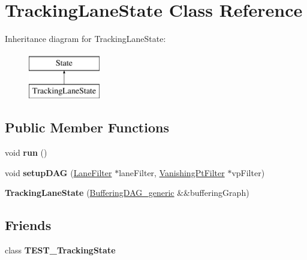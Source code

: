 \hypertarget{classTrackingLaneState}{\section{Tracking\-Lane\-State Class Reference}
\label{classTrackingLaneState}
}
Inheritance diagram for Tracking\-Lane\-State\-:\begin{figure}[H]
\begin{center}
\leavevmode
\includegraphics[height=2.000000cm]{classTrackingLaneState}
\end{center}
\end{figure}
\subsection*{Public Member Functions}
\begin{DoxyCompactItemize}
\item 
\hypertarget{classTrackingLaneState_ac57803df98ba03024c29ad864fddea11}{void {\bfseries run} ()}\label{classTrackingLaneState_ac57803df98ba03024c29ad864fddea11}

\item 
\hypertarget{classTrackingLaneState_a5f769fb1982e95791b5735844e5c0aa2}{void {\bfseries setup\-D\-A\-G} (\hyperlink{classLaneFilter}{Lane\-Filter} $\ast$lane\-Filter, \hyperlink{classVanishingPtFilter}{Vanishing\-Pt\-Filter} $\ast$vp\-Filter)}\label{classTrackingLaneState_a5f769fb1982e95791b5735844e5c0aa2}

\item 
\hypertarget{classTrackingLaneState_a77d46118062db8bdc0b114baaaece36e}{{\bfseries Tracking\-Lane\-State} (\hyperlink{classBufferingDAG__generic}{Buffering\-D\-A\-G\-\_\-generic} \&\&buffering\-Graph)}\label{classTrackingLaneState_a77d46118062db8bdc0b114baaaece36e}

\end{DoxyCompactItemize}
\subsection*{Friends}
\begin{DoxyCompactItemize}
\item 
\hypertarget{classTrackingLaneState_a3084c090c58f2a0dcf5e638b19d63653}{class {\bfseries T\-E\-S\-T\-\_\-\-Tracking\-State}}\label{classTrackingLaneState_a3084c090c58f2a0dcf5e638b19d63653}

\end{DoxyCompactItemize}
